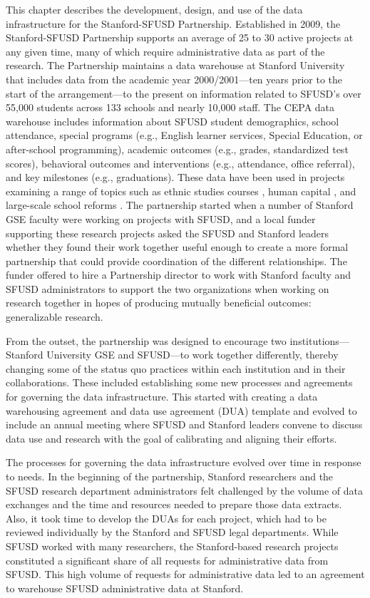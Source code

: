 This chapter describes the development, design, and use of the data infrastructure for the Stanford-SFUSD Partnership. Established in 2009, the Stanford-SFUSD Partnership supports an average of 25 to 30 active projects at any given time, many of which require administrative data as part of the research. The Partnership maintains a data warehouse at Stanford University that includes data from the academic year 2000/2001---ten years prior to the start of the arrangement---to the present on information related to SFUSD's over 55,000 students across 133 schools and nearly 10,000 staff. The CEPA data warehouse includes information about SFUSD student demographics, school attendance, special programs (e.g., English learner services, Special Education, or after-school programming), academic outcomes (e.g., grades, standardized test scores), behavioral outcomes and interventions (e.g., attendance, office referral), and key milestones (e.g., graduations). These data have been used in projects examining a range of topics such as ethnic studies courses \citep{dee2017}, human capital \citep{dizon-ross2019}, and large-scale school reforms \citep{sun2017}. The partnership started when a number of Stanford GSE faculty were working on projects with SFUSD, and a local funder supporting these research projects asked the SFUSD and Stanford leaders whether they found their work together useful enough to create a more formal partnership that could provide coordination of the different relationships. The funder offered to hire a Partnership director to work with Stanford faculty and SFUSD administrators to support the two organizations when working on research together in hopes of producing mutually beneficial outcomes: generalizable research.

From the outset, the partnership was designed to encourage two institutions---Stanford University GSE and SFUSD---to work together differently, thereby changing some of the status quo practices within each institution and in their collaborations. These included establishing some new processes and agreements for governing the data infrastructure. This started with creating a data warehousing agreement and data use agreement (DUA) template and evolved to include an annual meeting where SFUSD and Stanford leaders convene to discuss data use and research with the goal of calibrating and aligning their efforts.

The processes for governing the data infrastructure evolved over time in response to needs. In the beginning of the partnership, Stanford researchers and the SFUSD research department administrators felt challenged by the volume of data exchanges and the time and resources needed to prepare those data extracts. Also, it took time to develop the DUAs for each project, which had to be reviewed individually by the Stanford and SFUSD legal departments. While SFUSD worked with many researchers, the Stanford-based research projects constituted a significant share of all requests for administrative data from SFUSD. This high volume of requests for administrative data led to an agreement to warehouse SFUSD administrative data at Stanford.

